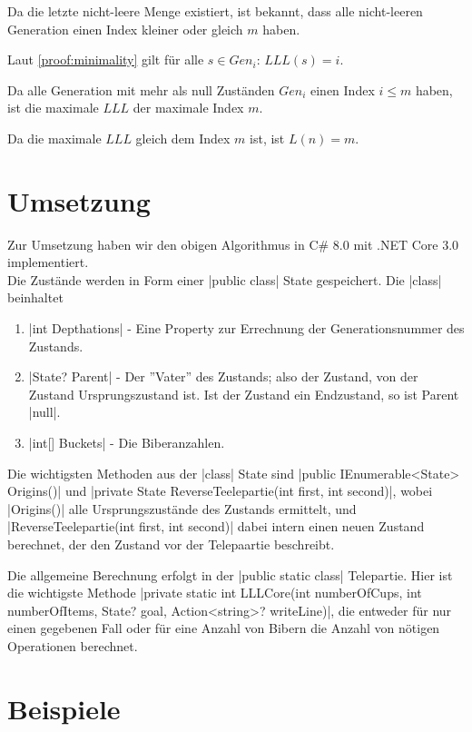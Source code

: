 \documentclass[a4paper,10pt,ngerman]{scrartcl}
\begin{document}
Da die letzte nicht-leere Menge existiert, ist bekannt, dass alle nicht-leeren Generation einen Index kleiner oder gleich \(m\) haben.

Laut \cref{proof:minimality} gilt für alle \(s \in Gen_i\): \(LLL(s) = i\).

Da alle Generation mit mehr als null Zuständen \(Gen_i\) einen Index \(i \leq m\) haben, ist die maximale \(LLL\) der maximale Index \(m\).

Da die maximale \(LLL\) gleich dem Index \(m\) ist, ist \(L(n) = m\).

\section{Umsetzung}

Zur Umsetzung haben wir den obigen Algorithmus in C\# 8.0 mit
.NET Core 3.0 implementiert.\\
Die Zustände werden in Form einer |public class| State gespeichert.
Die |class| beinhaltet

\begin{enumerate}
    \item |int Depthations| - 
        Eine Property zur Errechnung der Generationsnummer des Zustands.
    \item |State? Parent| - 
        Der ''Vater'' des Zustands; also der Zustand, von der Zustand Ursprungszustand ist.
        Ist der Zustand ein Endzustand, so ist Parent |null|.
    \item |int[] Buckets| - Die Biberanzahlen.
\end{enumerate}

Die wichtigsten Methoden aus der |class| State sind |public IEnumerable<State> Origins()| und |private State ReverseTeelepartie(int first, int second)|, wobei |Origins()| alle Ursprungszustände des Zustands ermittelt, und |ReverseTeelepartie(int first, int second)| dabei intern einen neuen Zustand berechnet, der den Zustand vor der Telepaartie beschreibt. 

Die allgemeine Berechnung erfolgt in der |public static class| Telepartie. Hier ist die wichtigste Methode |private static int LLLCore(int numberOfCups, int numberOfItems, State? goal, Action<string>? writeLine)|, die entweder für nur einen gegebenen Fall oder für eine Anzahl von Bibern die Anzahl von nötigen Operationen berechnet.

\section{Beispiele}
\end{document}
